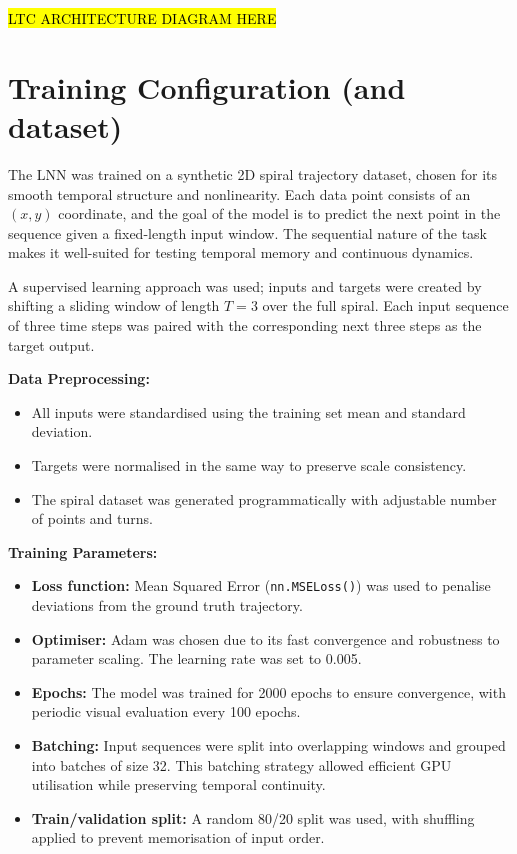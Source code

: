 \hl{LTC ARCHITECTURE DIAGRAM HERE}

\section{Training Configuration (and dataset)}
The LNN was trained on a synthetic 2D spiral trajectory dataset, chosen for its smooth temporal structure and nonlinearity. Each data point consists of an $(x, y)$ coordinate, and the goal of the model is to predict the next point in the sequence given a fixed-length input window. The sequential nature of the task makes it well-suited for testing temporal memory and continuous dynamics.

A supervised learning approach was used; inputs and targets were created by shifting a sliding window of length $T = 3$ over the full spiral. Each input sequence of three time steps was paired with the corresponding next three steps as the target output.

\vspace{1em}
\noindent \textbf{Data Preprocessing:}
\begin{itemize}
    \item All inputs were standardised using the training set mean and standard deviation.
    \item Targets were normalised in the same way to preserve scale consistency.
    \item The spiral dataset was generated programmatically with adjustable number of points and turns.
\end{itemize}

\vspace{0.5em}
\noindent \textbf{Training Parameters:}
\begin{itemize}
    \item \textbf{Loss function:} Mean Squared Error (\texttt{nn.MSELoss()}) was used to penalise deviations from the ground truth trajectory.
    \item \textbf{Optimiser:} Adam was chosen due to its fast convergence and robustness to parameter scaling. The learning rate was set to 0.005.
    \item \textbf{Epochs:} The model was trained for 2000 epochs to ensure convergence, with periodic visual evaluation every 100 epochs.
    \item \textbf{Batching:} Input sequences were split into overlapping windows and grouped into batches of size 32. This batching strategy allowed efficient GPU utilisation while preserving temporal continuity.
    \item \textbf{Train/validation split:} A random 80/20 split was used, with shuffling applied to prevent memorisation of input order.
\end{itemize}

